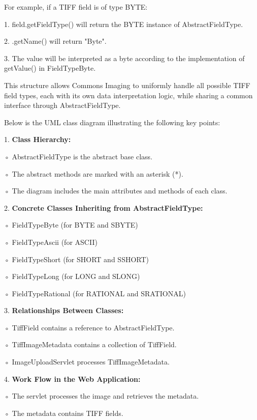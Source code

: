 \documentclass[sigconf]{acmart}
\begin{document}
\vspace{0,5cm}
For example, if a TIFF field is of type BYTE:

1. field.getFieldType() will return the BYTE instance of AbstractFieldType.
    
2. .getName() will return "Byte".
    
3. The value will be interpreted as a byte according to the implementation of getValue() in FieldTypeByte.

This structure allows Commons Imaging to uniformly handle all possible TIFF field types, each with its own data interpretation logic, while sharing a common interface through AbstractFieldType.    

\vspace{0,5cm}
Below is the UML class diagram illustrating the following key points:

    1. \textbf{Class Hierarchy:}
    
        ◦ AbstractFieldType is the abstract base class.
        
        ◦ The abstract methods are marked with an asterisk (*).
        
        ◦ The diagram includes the main attributes and methods of each class.
        
    2. \textbf{Concrete Classes Inheriting from AbstractFieldType:}
    
        ◦ FieldTypeByte (for BYTE and SBYTE)
        
        ◦ FieldTypeAscii (for ASCII)
        
        ◦ FieldTypeShort (for SHORT and SSHORT)
        
        ◦ FieldTypeLong (for LONG and SLONG)
        
        ◦ FieldTypeRational (for RATIONAL and SRATIONAL)
        
    3. \textbf{Relationships Between Classes:}
    
        ◦ TiffField contains a reference to AbstractFieldType.
        
        ◦ TiffImageMetadata contains a collection of TiffField.
        
        ◦ ImageUploadServlet processes TiffImageMetadata.

    4. \textbf{Work Flow in the Web Application:}
    
        ◦ The servlet processes the image and retrieves the metadata.
        
        ◦ The metadata contains TIFF fields.
        
\end{document}
